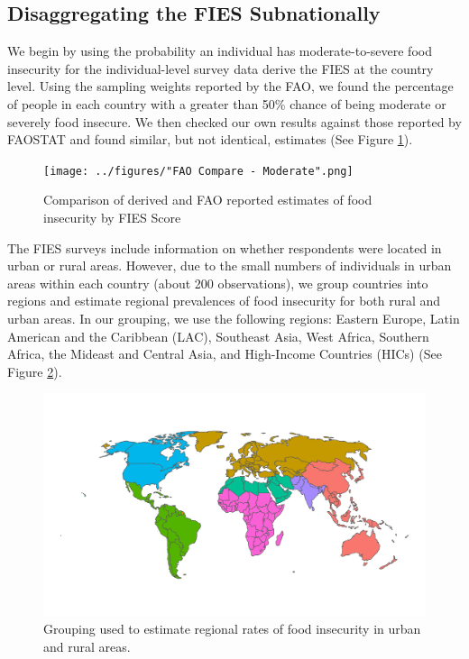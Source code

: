 \documentclass{article}
\begin{document}
\subsection{Disaggregating the FIES Subnationally}
We begin by using the probability an individual has moderate-to-severe food insecurity for the individual-level survey data derive the FIES at the country level.  Using the sampling weights reported by the FAO, we found the percentage of people in each country with a greater than 50\% chance of being moderate or severely food insecure. We then checked our own results against those reported by FAOSTAT and found similar, but not identical, estimates (See Figure \ref{fig:comparison}).

\begin{figure}[h]
	\centering
	\texttt{[image: ../figures/"FAO Compare - Moderate".png]}
	\caption{Comparison of derived and FAO reported estimates of food insecurity by FIES Score}
	\label{fig:comparison}
\end{figure}

The FIES surveys include information on whether respondents were located in urban or rural areas.  However, due to the small numbers of individuals in urban areas within each country (about 200 observations), we group countries into regions and estimate regional prevalences of food insecurity for both rural and urban areas.  In our grouping, we use the following regions: Eastern Europe, Latin American and the Caribbean (LAC), Southeast Asia, West Africa, Southern Africa, the Mideast and Central Asia, and High-Income Countries (HICs) (See Figure \ref{fig:regions}).

\begin{figure}[h]
	\centering
	\includegraphics[width=\linewidth]{../figures/regions.png}
	\caption{Grouping used to estimate regional rates of food insecurity in urban and rural areas.}
	\label{fig:regions}
\end{figure}
\end{document}
